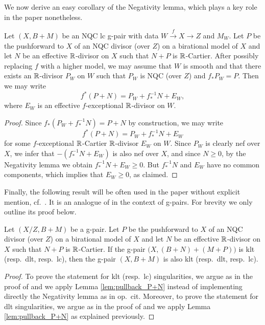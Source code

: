 	We now derive an easy corollary of the Negativity lemma, which plays a key role in the paper nonetheless.
	
	\begin{lem}\label{lem:pullback_P+N}
		Let $ (X,B+M) $ be an NQC lc g-pair with data $ W \overset{f}{\longrightarrow} X \to Z $ and $ M_W $. Let $ P $ be the pushforward to $ X $ of an NQC divisor (over $ Z $) on a birational model of $ X $ and let $ N $ be an effective $ \mathbb{R} $-divisor on $ X $ such that $ N+P $ is $ \mathbb{R} $-Cartier. After possibly replacing $f$ with a higher model, we may assume that $W$ is smooth and that there exists an $\mathbb{R}$-divisor $P_W$ on $W$ such that $P_W$ is NQC (over $Z$) and $ f_* P_W = P $. Then we may write
		\[ f^*(P+N) = P_W + f_*^{-1} N + E_W , \]
		where $E_W$ is an effective $f$-exceptional $\mathbb{R}$-divisor on $W$.
	\end{lem}
	
	\begin{proof}
		Since $ f_* (P_W + f_*^{-1} N) = P + N $ by construction, we may write
		\[ f^*(P+N) = P_W + f_*^{-1} N + E_W \]
		for some $f$-exceptional $\mathbb{R}$-Cartier $\mathbb{R}$-divisor $E_W$ on $W$. Since $P_W$ is clearly nef over $X$, we infer that $ - (f_*^{-1} N + E_W) $ is also nef over $X$, and since $N \geq 0$, by the Negativity lemma we obtain $ f_*^{-1} N + E_W \geq 0 $. But $ f_*^{-1} N $ and $ E_W $ have no common components, which implies that $ E_W \geq 0 $, as claimed.
	\end{proof}
	
	Finally, the following result will be often used in the paper without explicit mention, cf.\ \cite[Lemma 2.3]{LT22b}. It is an analogue of \cite[Corollaries 2.35(1) and 2.39(1)]{KM98} in the context of g-pairs. For brevity we only outline its proof below.
	
	\begin{lem}
		Let $ (X/Z,B+M) $ be a g-pair. Let $ P $ be the pushforward to $ X $ of an NQC divisor (over $ Z $) on a birational model of $ X $ and let $ N $ be an effective $ \mathbb{R} $-divisor on $ X $ such that $ N+P $ is $ \mathbb{R} $-Cartier. If the g-pair $ \big( X, (B+N) + (M+P) \big) $ is klt (resp.\ dlt, resp.\ lc), then the g-pair $ (X,B+M) $ is also klt (resp.\ dlt, resp.\ lc).
	\end{lem}
	
	\begin{proof}
		To prove the statement for klt (resp.\ lc) singularities, we argue as in the proof of \cite[Lemma 2.6]{CT20} and we apply Lemma \ref{lem:pullback_P+N} instead of implementing directly the Negativity lemma as in op.\ cit. Moreover, to prove the statement for dlt singularities, we argue as in the proof of \cite[Lemma 2.3]{LT22b} and we apply Lemma \ref{lem:pullback_P+N} as explained previously.
	\end{proof}
	
